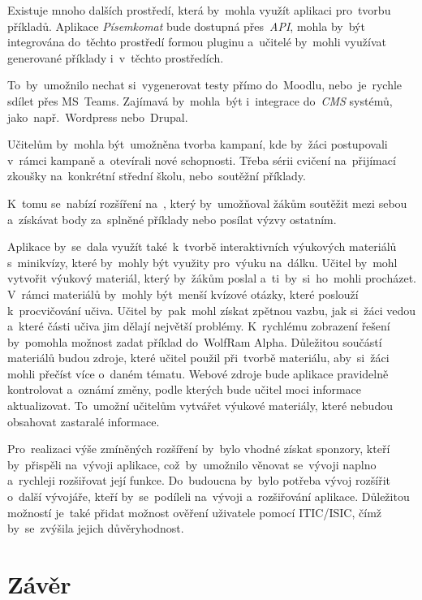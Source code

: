 \documentclass[10pt,a4paper]{article}
\begin{document}
        Existuje mnoho dalších prostředí, která by~mohla využít aplikaci pro~tvorbu příkladů. Aplikace \emph{Písemkomat} bude dostupná přes~\emph{API}, mohla by~být integrována do~těchto prostředí formou pluginu a~učitelé by~mohli využívat generované příklady i~v~těchto prostředích.
        
        To~by~umožnilo nechat si~vygenerovat testy přímo do~Moodlu, nebo~je~rychle sdílet přes MS~Teams. Zajímavá by~mohla~být i~integrace do~\emph{CMS} systémů, jako~např.~Wordpress nebo~Drupal.

        Učitelům by~mohla být~umožněna tvorba kampaní, kde by~žáci postupovali v~rámci kampaně a~otevírali nové schopnosti. Třeba sérii cvičení na~přijímací zkoušky na~konkrétní střední školu, nebo~soutěžní příklady.
        
        K~tomu se~nabízí rozšíření na~, který by~umožňoval žákům soutěžit mezi sebou a~získávat body za~splněné příklady nebo posílat výzvy ostatním.

        Aplikace by~se~dala využít také~k~tvorbě interaktivních výukových materiálů s~minikvízy, které by~mohly být využity pro~výuku na~dálku. Učitel by~mohl vytvořit výukový materiál, který by~žákům poslal a~ti~by~si~ho~mohli procházet. V~rámci materiálů by~mohly být~menší kvízové otázky, které poslouží k~procvičování učiva. Učitel by~pak~mohl získat zpětnou vazbu, jak si~žáci vedou a~které části učiva jim dělají největší problémy. K~rychlému zobrazení řešení by~pomohla možnost zadat příklad do~WolfRam Alpha. Důležitou součástí materiálů budou zdroje, které učitel použil při~tvorbě materiálu, aby~si~žáci mohli přečíst více o~daném tématu. Webové zdroje bude aplikace pravidelně kontrolovat a~oznámí změny, podle kterých bude učitel moci informace aktualizovat. To~umožní učitelům vytvářet výukové materiály, které nebudou obsahovat zastaralé informace.
        
        Pro~realizaci výše zmíněných rozšíření by~bylo vhodné získat sponzory, kteří by~přispěli na~vývoji aplikace, což~by~umožnilo věnovat se~vývoji naplno a~rychleji rozšiřovat její funkce. Do~budoucna by~bylo potřeba vývoj rozšířit o~další vývojáře, kteří by~se~podíleli na~vývoji a~rozšiřování aplikace. Důležitou možností je~také přidat možnost ověření uživatele pomocí ITIC/ISIC, čímž by~se~zvýšila jejich důvěryhodnost.
	\section{Závěr}

    \newpage
    \printbibliography
\end{document}
